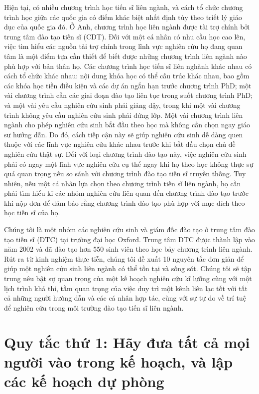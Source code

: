 \documentclass[12pt]{report}
\begin{document}
Hiện tại, có nhiều chương trình học tiến sĩ liên ngành, và cách tổ chức chương trình học giữa các quốc gia có điểm khác biệt nhất định tùy theo triết lý giáo dục của quốc gia đó. Ở Anh, chương trình học liên ngành được tài trợ chính bởi trung tâm đào tạo tiến sĩ (CDT). Đối với một cá nhân có nhu cầu học cao lên, việc tìm hiểu các nguồn tài trợ chính trong lĩnh vực nghiên cứu họ đang quan tâm là một điểm tựa cần thiết để biết được những chương trình liên ngành nào phù hợp với bản thân họ. Các chương trình học tiến sĩ liên nghành khác nhau có cách tổ chức khác nhau: nội dung khóa học có thể cấu trúc khác nhau, bao gồm các khóa học tiền điều kiện và các dự án ngắn hạn trước chương trình PhD; một vài chương trình cần các giai đoạn đào tạo liên tục trong suốt chương trình PhD; và một vài yêu cầu nghiên cứu sinh phải giảng dậy, trong khi một vài chương trình không yêu cầu nghiên cứu sinh phải đứng lớp. Một vài chương trình liên ngành cho phép nghiên cứu sinh bắt đầu theo học mà không cần chọn ngay giáo sư hướng dẫn. Do đó, cách tiếp cận này sẽ giúp nghiên cứu sinh dễ dàng quen thuộc với các lĩnh vực nghiên cứu khác nhau trước khi bắt đầu chọn chủ đề nghiên cứu thật sự. Đối với loại chương trình đào tạo này, việc nghiên cứu sinh phải có ngay một lĩnh vực nghiên cứu cụ thể ngay khi họ theo học không thực sự quá quan trọng nếu so sánh với chương trình đào tạo tiến sĩ truyền thống. Tuy nhiên, nếu một cá nhân lựa chọn theo chương trình tiến sĩ liên ngành, họ cần phải tìm hiểu kĩ các nhóm nghiên cứu liên quan đến chương trình đào tạo trước khi nộp đơn để đảm bảo rằng chương trình đào tạo phù hợp với mục đích theo học tiến sĩ của họ.

Chúng tôi là một nhóm các nghiên cứu sinh và giám đốc đào tạo ở trung tâm đào tạo tiến sĩ (DTC) tại trường đại học Oxford. Trung tâm DTC được thành lập vào năm 2002 và đã đào tạo hơn 550 sinh viên theo học bảy chương trình liên ngành. Rút ra từ kinh nghiệm thực tiễn, chúng tôi đề xuất 10 nguyên tắc đơn giản để giúp một nghiên cứu sinh liên ngành có thể tồn tại và sống sót. Chúng tôi sẽ tập trung nêu bật sự quan trọng của một kế hoạch nghiên cứu kĩ lưỡng cùng với một lịch trình khả thi, tầm quan trọng của việc duy trì một kênh liên lạc tốt với tất cả những người hướng dẫn và các cá nhân hợp tác, cùng với sự tự do về trí tuệ để nghiên cứu trong môi trường đào tạo tiến sĩ liên ngành.

\section{Quy tắc thứ 1: Hãy đưa tất cả mọi người vào trong kế hoạch, và lập các kế hoạch dự phòng}
\end{document}
